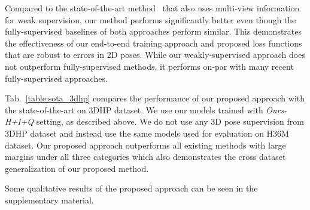 Compared to the state-of-the-art method~\cite{kocabas2019epipolar} that also uses multi-view information for weak supervision, our method performs significantly better even though the fully-supervised baselines of both approaches perform similar. This demonstrates the effectiveness of our end-to-end training approach and proposed loss functions that are robust to errors in 2D poses. 
While our weakly-supervised approach does not outperform fully-supervised methods, it performs on-par with many recent fully-supervised approaches. 




Tab.~\ref{table:sota_3dhp} compares the performance of our proposed approach with the state-of-the-art on 3DHP dataset. We use our models trained with \textit{Ours-H+I+Q} setting, as described above. We do not use any 3D pose supervision from 3DHP dataset and instead use the same models used for evaluation on H36M dataset. Our proposed approach outperforms all existing methods with large margins under all three categories which also demonstrates the cross dataset generalization of our proposed method. 


Some qualitative results of the proposed approach can be seen in the supplementary material.


